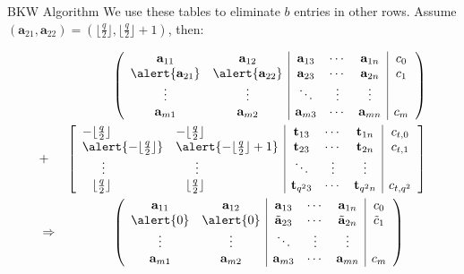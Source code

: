 \documentclass[10pt,compress]{beamer}
\renewcommand{\vec}[1]{\mathbf{#1}\xspace}
\newcommand{\shortvec}[1]{\tilde{\mathbf{#1}}\xspace}
\renewcommand{\vec}[1]{\mathbf{#1}\xspace}
\begin{document}
\begin{frame}{BKW Algorithm}
We use these tables to eliminate $b$ entries in other rows. Assume $(\vec{a}_{21},\vec{a}_{22}) = (\lfloor\frac{q}{2}\rfloor, \lfloor\frac{q}{2}\rfloor+1)$, then:
\begin{footnotesize}
\begin{eqnarray*}
& & \left(
\begin{array}{cc|ccc|c}
\vec{a}_{11} & \vec{a}_{12} & \vec{a}_{13} & \cdots & \vec{a}_{1n} & c_0\\
\alert{\vec{a}_{21}} & \alert{\vec{a}_{22}} & \vec{a}_{23} & \cdots & \vec{a}_{2n} & c_1\\
\vdots & \vdots & \ddots & \vdots & \vdots\\
\vec{a}_{m1} & \vec{a}_{m2} & \vec{a}_{m3} & \cdots & \vec{a}_{mn} & c_{m}
\end{array}
\right)\\
&+& \left[
\begin{array}{ll|ccc|c}
-\lfloor\frac{q}{2}\rfloor & -\lfloor\frac{q}{2}\rfloor & \bold{t}_{13} & \cdots & \bold{t}_{1n} & c_{t,0}\\
\alert{-\lfloor\frac{q}{2}\rfloor} & \alert{-\lfloor\frac{q}{2}\rfloor+1} & \bold{t}_{23} & \cdots & \bold{t}_{2n} & c_{t,1}\\
\phantom{--}\vdots & \phantom{--}\vdots & \ddots & \vdots & \vdots\\
\phantom{-}\lfloor\frac{q}{2}\rfloor & \phantom{-}\lfloor\frac{q}{2}\rfloor& \bold{t}_{q^23} & \cdots & \bold{t}_{q^2n} & c_{t,q^2}
\end{array}\right]\\
&\Rightarrow& \left(
\begin{array}{cc|ccc|c}
\vec{a}_{11} & \vec{a}_{12} & \vec{a}_{13} & \cdots & \vec{a}_{1n} & c_0\\
\alert{0} & \alert{0} & \shortvec{a}_{23} & \cdots & \shortvec{a}_{2n} & \tilde{c}_1\\
\vdots & \vdots & \ddots & \vdots & \vdots\\
\vec{a}_{m1} & \vec{a}_{m2} & \vec{a}_{m3} & \cdots & \vec{a}_{mn} & c_{m}
\end{array}
\right)\phantom{\Longrightarrow}
\end{eqnarray*}
 \end{footnotesize}
\end{frame}

\newcommand{\pivot}[4]{
\draw[fill=skyblue1]   (#1, #2) --(#1, #2+.5) -- (7.5, #2+.5) -- (7.5, #2) -- (#1, #2);
\draw[fill=skyblue1] (#3+0.5, #2) --(#3+0,   #2+.5) -- (7.5, #2+.5) -- (7.5, #2) -- (#3+0.5, #2);
\draw[fill=#4] (0,#2) -- (#1,#2) -- (#1,#2+.5) -- (0,#2+.5) -- (0,#2);
}
\end{document}
